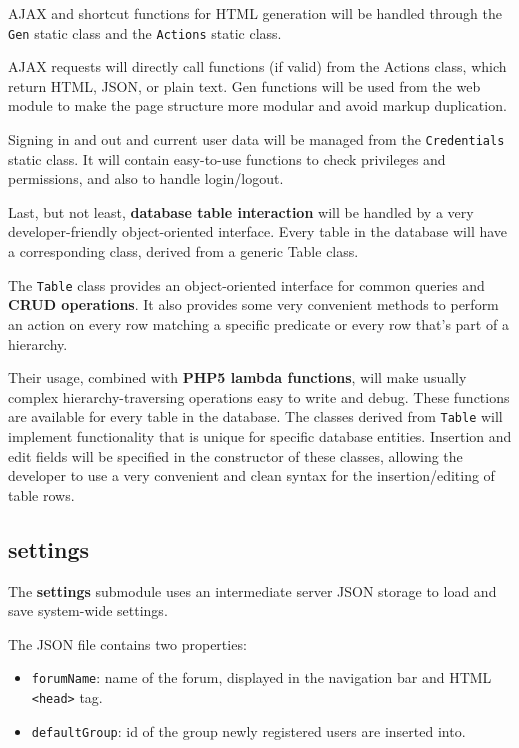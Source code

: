 \documentclass[12pt]{report}
\renewcommand\emph{\textbf}
\begin{document}
                AJAX and shortcut functions for HTML generation will be handled through the \texttt{Gen} static class and the \texttt{Actions} static class.

                AJAX requests will directly call functions (if valid) from the Actions class, which return HTML, JSON, or plain text. Gen functions will be used from the web module to make the page structure more modular and avoid markup duplication.

                Signing in and out and current user data will be managed from the \texttt{Credentials} static class. It will contain easy-to-use functions to check privileges and permissions, and also to handle login/logout.

                Last, but not least, \emph{database table interaction} will be handled by a very developer-friendly object-oriented interface. Every table in the database will have a corresponding class, derived from a generic Table class.

                The \texttt{Table} class provides an object-oriented interface for common queries and \emph{CRUD operations}. It also provides some very convenient methods to perform an action on every row matching a specific predicate or every row that’s part of a hierarchy.

                Their usage, combined with \emph{PHP5 lambda functions}, will make usually complex hierarchy-traversing operations easy to write and debug. These functions are available for every table in the database. The classes derived from \texttt{Table} will implement functionality that is unique for specific database entities. Insertion and edit fields will be specified in the constructor of these classes, allowing the developer to use a very convenient and clean syntax for the insertion/editing of table rows.

                \subsection{settings}

                    The \emph{settings} submodule uses an intermediate server JSON storage to load and save system-wide settings.

                    The JSON file contains two properties:

                    \begin{itemize}
                        \item \texttt{forumName}: name of the forum, displayed in the navigation bar and HTML \texttt{<head>} tag.
                        \item \texttt{defaultGroup}: id of the group newly registered users are inserted into.
                    \end{itemize}
\end{document}
